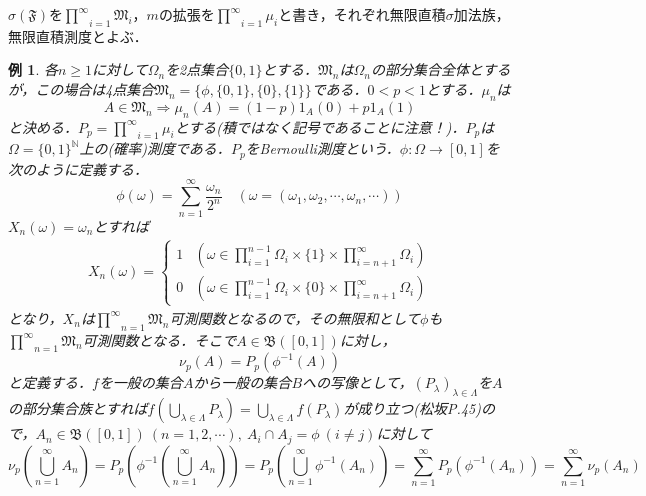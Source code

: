 \documentclass[a4paper,11pt]{jsarticle}
\newtheorem{instance}[definition]{例}%
\begin{document}
%
%
%
$\sigma(\mathfrak{F})$を$\underset{i=1}{\overset{\infty}{\prod}}\mathfrak{M}_i$，$m$の拡張を$\underset{i=1}{\overset{\infty}{\prod}}\mu_i$と書き，それぞれ無限直積$\sigma$加法族，無限直積測度とよぶ．
%
%
%
\begin{instance}
各$n\geq 1$に対して$\Omega_n$を2点集合$\{0,1\}$とする．$\mathfrak{M}_n$は$\Omega_n$の部分集合全体とするが，この場合は4点集合$\mathfrak{M}_n=\{\phi,\{0,1\},\{0\},\{1\}\}$である．$0<p<1$とする．$\mu_n$は
\begin{equation*}
A\in\mathfrak{M}_n\Longrightarrow \mu_n(A)=(1-p)1_A(0)+p1_A(1)
\end{equation*}
と決める．$P_p=\underset{i=1}{\overset{\infty}{\prod}}\mu_i$とする(積ではなく記号であることに注意！)．$P_p$は$\Omega=\{0,1\}^\mathbb{N}$上の(確率)測度である．$P_p$をBernoulli測度という．$\phi:\Omega \rightarrow [0,1]$を次のように定義する．
\begin{equation*}
\phi(\omega)=\sum_{n=1}^\infty \frac{\omega_n}{2^n} \quad (\omega=(\omega_1,\omega_2,\cdots,\omega_n,\cdots))
\end{equation*}
$X_n(\omega)=\omega_n$とすれば
\begin{eqnarray*}
X_n(\omega)=\begin{cases}
1 & \left(\displaystyle \omega\in \prod_{i=1}^{n-1}\Omega_i\times\{1\}\times\prod_{i=n+1}^\infty\Omega_i\right) \\
0 & \left(\displaystyle \omega\in \prod_{i=1}^{n-1}\Omega_i\times\{0\}\times\prod_{i=n+1}^\infty\Omega_i\right)
\end{cases}
\end{eqnarray*}
となり，$X_n$は$\underset{n=1}{\overset{\infty}{\prod}}\mathfrak{M}_n$可測関数となるので，その無限和として$\phi$も$\underset{n=1}{\overset{\infty}{\prod}}\mathfrak{M}_n$可測関数となる．そこで$A\in\mathfrak{B}([0,1])$に対し，
\begin{equation*}
\nu_p(A)=P_p(\phi^{-1}(A))
\end{equation*}
と定義する．$f$を一般の集合$A$から一般の集合$B$への写像として，$(P_\lambda)_{\lambda\in\Lambda}$を$A$の部分集合族とすれば$f(\underset{{\lambda\in\Lambda}}{\bigcup}P_\lambda)=\underset{\lambda\in\Lambda}{\bigcup} f(P_\lambda)$が成り立つ(松坂P.45)ので，$A_n\in\mathfrak{B}([0,1]){\ }(n=1,2,\cdots),{\ }A_i\cap A_j=\phi{\ }(i\neq j)$に対して
\begin{equation*}
\nu_p\left(\underset{n=1}{\overset{\infty}{\bigcup}}A_n\right)=P_p\left(\phi^{-1}\left(\underset{n=1}{\overset{\infty}{\bigcup}}A_n\right)\right)=P_p\left(\underset{n=1}{\overset{\infty}{\bigcup}} \phi^{-1}(A_n)\right)=\sum_{n=1}^\infty P_p(\phi^{-1}(A_n))=\sum_{n=1}^\infty \nu_p(A_n)

\end{equation*}
\end{instance}
\end{document}
